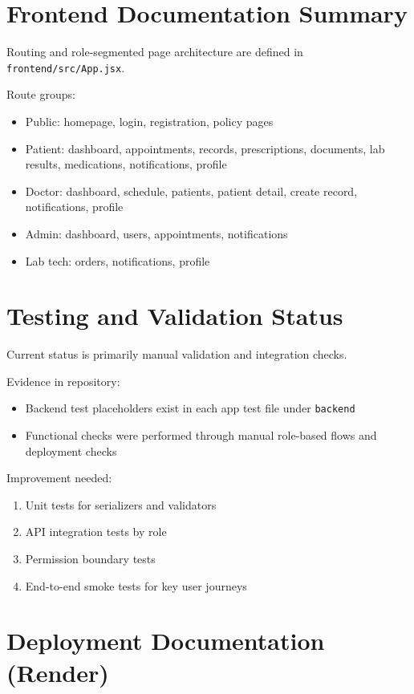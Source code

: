 \documentclass[12pt,a4paper]{article}
\begin{document}
\section{Frontend Documentation Summary}

Routing and role-segmented page architecture are defined in \texttt{frontend/src/App.jsx}.

Route groups:
\begin{itemize}
  \item Public: homepage, login, registration, policy pages
  \item Patient: dashboard, appointments, records, prescriptions, documents, lab results, medications, notifications, profile
  \item Doctor: dashboard, schedule, patients, patient detail, create record, notifications, profile
  \item Admin: dashboard, users, appointments, notifications
  \item Lab tech: orders, notifications, profile
\end{itemize}

\section{Testing and Validation Status}

Current status is primarily manual validation and integration checks.

Evidence in repository:
\begin{itemize}
  \item Backend test placeholders exist in each app test file under \texttt{backend}
  \item Functional checks were performed through manual role-based flows and deployment checks
\end{itemize}

Improvement needed:
\begin{enumerate}
  \item Unit tests for serializers and validators
  \item API integration tests by role
  \item Permission boundary tests
  \item End-to-end smoke tests for key user journeys
\end{enumerate}

\section{Deployment Documentation (Render)}
\end{document}
